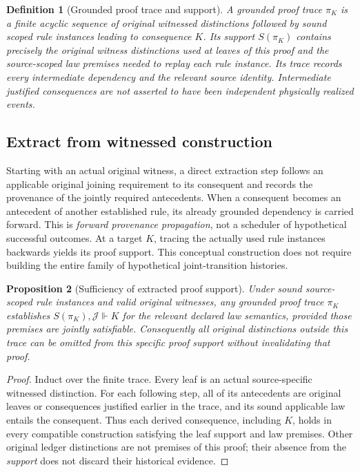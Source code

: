 \documentclass[11pt]{article}
\newtheorem{definition}{Definition}[section]
\newtheorem{proposition}[definition]{Proposition}
\newcommand{\Laws}{\mathcal{J}}
\begin{document}
\begin{definition}[Grounded proof trace and support]
A grounded proof trace $\pi_K$ is a finite acyclic
sequence of original witnessed distinctions followed
by sound scoped rule instances leading to consequence
$K$. Its \emph{support} $S(\pi_K)$ contains precisely
the original witness distinctions used at leaves of
this proof and the source-scoped law premises needed
to replay each rule instance. Its trace records every
intermediate dependency and the relevant source identity.
Intermediate justified consequences are not asserted to
have been independent physically realized events.
\end{definition}

\subsection{Extract from witnessed construction}
Starting with an actual original witness, a direct
extraction step follows an applicable original joining
requirement to its consequent and records the
provenance of the jointly required antecedents.
When a consequent becomes an antecedent of another
established rule, its already grounded dependency
is carried forward. This is \emph{forward provenance
propagation}, not a scheduler of hypothetical successful
outcomes. At a target $K$, tracing the actually used
rule instances backwards yields its proof support.
This conceptual construction does not require
building the entire family of hypothetical
joint-transition histories.

\begin{proposition}[Sufficiency of extracted proof support]
Under sound source-scoped rule instances and valid original
witnesses, any grounded proof trace $\pi_K$ establishes
$S(\pi_K),\Laws\Vdash K$ for the relevant declared
law semantics, provided those premises are jointly
satisfiable. Consequently all original distinctions
outside this trace can be omitted \emph{from this
specific proof support} without invalidating that
proof.
\end{proposition}
\begin{proof}
Induct over the finite trace. Every leaf is an
actual source-specific witnessed distinction.
For each following step, all of its antecedents
are original leaves or consequences justified
earlier in the trace, and its sound applicable
law entails the consequent. Thus each derived
consequence, including $K$, holds in every
compatible construction satisfying the leaf
support and law premises. Other original
ledger distinctions are not premises of this
proof; their absence from the \emph{support}
does not discard their historical evidence.
\end{proof}
\end{document}
